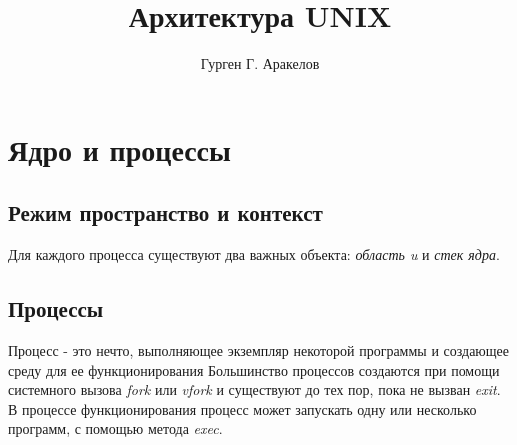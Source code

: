 \documentclass[12pt,a5paper,oneside]{book}
\author{Гурген Г. Аракелов}
\title{Архитектура UNIX}
\begin{document}
\maketitle
\tableofcontents

\chapter{Ядро и процессы}
\section{Режим пространство и контекст}
Для каждого процесса существуют два важных объекта:  \textit{область u} и \textit{стек ядра}.
\section{Процессы}
Процесс - это нечто, выполняющее экземпляр некоторой программы и создающее среду для ее функционирования
Большинство процессов создаются при помощи системного вызова \textit{fork} или \textit{vfork} и существуют до тех пор, пока не вызван \textit{exit}.
В процессе функционирования процесс может запускать одну или несколько программ, с помощью метода \textit{exec}. 
\end{document}
